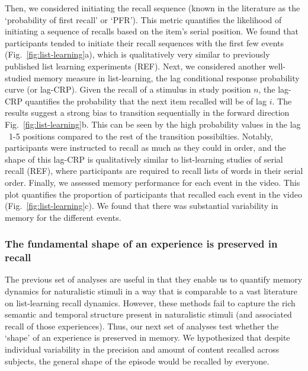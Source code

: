 \documentclass{article}
\begin{document}
{Then, we considered initiating the recall sequence (known in the literature as the `probability of first recall' or `PFR'). This metric quantifies the likelihood of initiating a sequence of recalls based on the item's serial position. We found that participants tended to initiate their recall sequences with the first few events (Fig.~\ref{fig:list-learning}a), which is qualitatively very similar to previously published list learning experiments (REF).  Next, we considered another well-studied memory measure in list-learning, the lag conditional response probability curve (or lag-CRP). Given the recall of a stimulus in study position $n$, the lag-CRP quantifies the probability that the next item recalled will be of lag $i$. The results suggest a strong bias to transition sequentially in the forward direction Fig.~\ref{fig:list-learning}b. This can be seen by the high probability values in the lag ~1-5 positions compared to the rest of the transition possibilties. Notably, participants were instructed to recall as much as they could in order, and the shape of this lag-CRP is qualitatively similar to list-learning studies of serial recall (REF), where participants are required to recall lists of words in their serial order. Finally, we assessed memory performance for each event in the video. This plot quantifies the proportion of participants that recalled each event in the video (Fig.~\ref{fig:list-learning}c). We found that there was substantial variability in memory for the different events. %

\subsubsection{The fundamental shape of an experience is preserved in recall}
The previous set of analyses are useful in that they enable us to quantify memory dynamics for naturalistic stimuli in a way that is comparable to a vast literature on list-learning recall dynamics. However, these methods fail to capture the rich semantic and temporal structure present in naturalistic stimuli (and associated recall of those experiences). Thus, our next set of analyses test whether the `shape' of an experience is preserved in memory. We hypothesized that despite individual variability in the precision and amount of content recalled across subjects, the general shape of the episode would be recalled by everyone.

}
\end{document}
